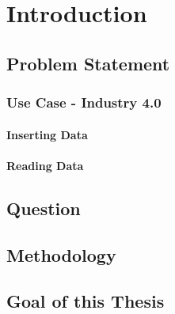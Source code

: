 \chapter{Introduction}
\label{ch:Introduction}

\section{Problem Statement}

\subsection{Use Case - Industry 4.0}

\subsubsection{Inserting Data}

\subsubsection{Reading Data}

\section{Question}

\section{Methodology}

\section{Goal of this Thesis}
